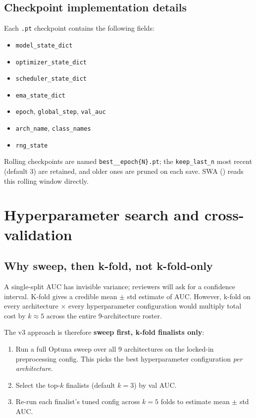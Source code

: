 \documentclass[10pt,a4paper]{article}
\begin{document}
\subsection{Checkpoint implementation details}
\label{app:checkpoints}

Each \texttt{.pt} checkpoint contains the following fields:
\begin{itemize}[leftmargin=*, noitemsep, topsep=2pt]
  \item \texttt{model\_state\_dict}
  \item \texttt{optimizer\_state\_dict}
  \item \texttt{scheduler\_state\_dict}
  \item \texttt{ema\_state\_dict}
  \item \texttt{epoch}, \texttt{global\_step}, \texttt{val\_auc}
  \item \texttt{arch\_name}, \texttt{class\_names}
  \item \texttt{rng\_state}
\end{itemize}
Rolling checkpoints are named \texttt{best\_\_epoch\{N\}.pt}; the
\texttt{keep\_last\_n} most recent (default 3) are retained, and
older ones are pruned on each save. SWA
() reads this rolling window directly.

\section{Hyperparameter search and cross-validation}

\subsection{Why sweep, then k-fold, not k-fold-only}

A single-split AUC has invisible variance; reviewers will ask for a
confidence interval. K-fold gives a credible mean $\pm$ std estimate
of AUC. However, k-fold on every architecture $\times$ every
hyperparameter configuration would multiply total cost by
$k \approx 5$ across the entire 9-architecture roster.

The v3 approach is therefore \textbf{sweep first, k-fold finalists
only}:

\begin{enumerate}[leftmargin=*]
  \item Run a full Optuna sweep over all 9 architectures on the
        locked-in preprocessing config. This picks the best
        hyperparameter configuration \textit{per architecture}.
  \item Select the top-$k$ finalists (default $k=3$) by val AUC.
  \item Re-run each finalist's tuned config across $k=5$ folds to
        estimate mean $\pm$ std AUC.
\end{enumerate}
\end{document}
